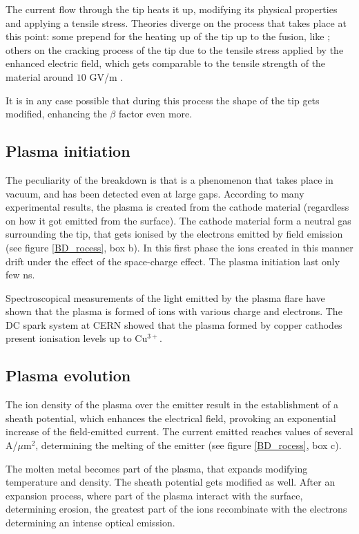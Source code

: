 The current flow through the tip heats it up, modifying its physical properties and applying a tensile stress. Theories diverge on the process that takes place at this point: some prepend for the heating up of the tip up to the fusion, like \cite{Grudiev:newLoc}; others on the cracking process of the tip due to the tensile stress applied by the enhanced electric field, which gets comparable to the tensile strength of the material around $10$ GV/m  \cite{Insepov:1373092}.

It is in any case possible that during this process the shape of the tip gets modified, enhancing the $\beta$ factor even more.


\subsection[Plasma initiation]{Plasma initiation}

The peculiarity of the breakdown is that is a phenomenon that takes place in vacuum, and has been detected even at large gaps. According to many experimental results, the plasma is created from the cathode material (regardless on how it got emitted from the surface). The cathode material form a neutral gas surrounding the tip, that gets ionised by the electrons emitted by field emission (see figure \ref{BD_rocess}, box b). In this first phase the ions created in this manner drift under the effect of the space-charge effect. The plasma initiation last only few ns.

Spectroscopical measurements of the light emitted by the plasma flare have shown that the plasma is formed of ions with various charge and electrons. The DC spark system at CERN showed that the plasma formed by copper cathodes present ionisation levels up to Cu$^{3+}$. \cite{find quote}


\subsection[Plasma evolution]{Plasma evolution}

The ion density of the plasma over the emitter result in the establishment of a sheath potential, which enhances the electrical field, provoking an exponential  increase of the field-emitted current. The current emitted reaches values of several A/$\mu$m$^2$, determining the melting of the emitter (see figure \ref{BD_rocess}, box c).

The molten metal becomes part of the plasma, that expands modifying temperature and density. The sheath potential gets modified as well. After an expansion process, where part of the plasma interact with the surface, determining erosion, the greatest part of the ions recombinate with the electrons determining an intense optical emission.



